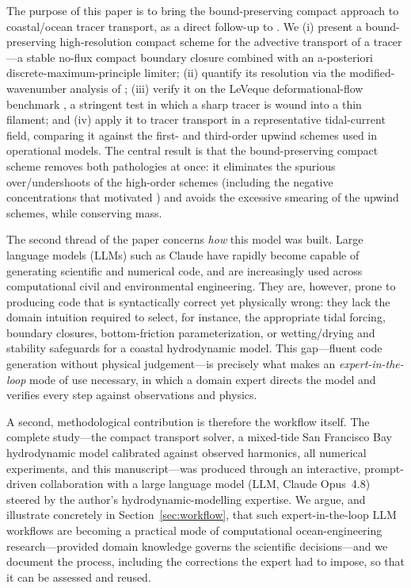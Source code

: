 \documentclass[Journal]{ascelike}   %
\begin{document}
The purpose of this paper is to bring the bound-preserving compact approach to
coastal/ocean tracer transport, as a direct follow-up to
\citet{sankaranarayanan1998}. We (i) present a bound-preserving high-resolution
compact scheme for the advective transport of a tracer---a stable no-flux compact
boundary closure combined with an a-posteriori discrete-maximum-principle
limiter; (ii) quantify its resolution via the modified-wavenumber analysis of
\citet{lele1992}; (iii) verify it on the LeVeque deformational-flow benchmark
\citep{leveque1996}, a stringent test in which a sharp tracer is wound into a thin
filament; and (iv) apply it to tracer transport in a representative tidal-current
field, comparing it against the first- and third-order upwind schemes used in
operational models. The central result is that the bound-preserving compact scheme
removes both pathologies at once: it eliminates the spurious over/undershoots of
the high-order schemes (including the negative concentrations that motivated
\citet{sankaranarayanan1998}) and avoids the excessive smearing of the upwind
schemes, while conserving mass.

The second thread of the paper concerns \emph{how} this model was built. Large
language models (LLMs) such as Claude \citep{anthropic2026claude} have rapidly become
capable of generating scientific and numerical code, and are increasingly used across
computational civil and environmental engineering. They are, however, prone to
producing code that is syntactically correct yet physically wrong: they lack the
domain intuition required to select, for instance, the appropriate tidal forcing,
boundary closures, bottom-friction parameterization, or wetting/drying and stability
safeguards for a coastal hydrodynamic model. This gap---fluent code generation
without physical judgement---is precisely what makes an \emph{expert-in-the-loop} mode
of use necessary, in which a domain expert directs the model and verifies every step
against observations and physics.

A second, methodological contribution is therefore the workflow itself. The complete study---the
compact transport solver, a mixed-tide San Francisco Bay hydrodynamic model
calibrated against observed harmonics, all numerical experiments, and this
manuscript---was produced through an interactive, prompt-driven collaboration with a
large language model (LLM, Claude Opus~4.8) steered by the author's
hydrodynamic-modelling expertise. We argue, and illustrate concretely in
Section~\ref{sec:workflow}, that such expert-in-the-loop LLM workflows are becoming a
practical mode of computational ocean-engineering research---provided domain
knowledge governs the scientific decisions---and we document the process,
including the corrections the expert had to impose, so that it can be assessed and
reused.
\end{document}
